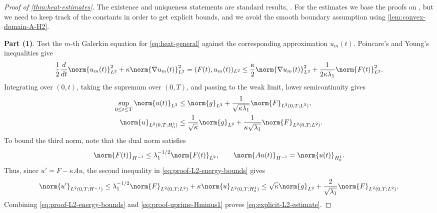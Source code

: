 \begin{proof}[Proof of \cref{thm:heat-estimates}]
The existence and uniqueness statements are standard results, \cite[Section 7.1.2]{evans_2010}. For the estimates we base the proofs on \cite{evans_2010}, but we need to keep track of the constants in order to get explicit bounds, and we avoid the smooth boundary assumption using \cref{lem:convex-domain-A-H2}.

\textbf{Part (1)}.
Test the $m$-th Galerkin equation for \eqref{eq:heat-general} against the corresponding approximation \(u_m(t)\).  Poincare's and Young's
inequalities give
\begin{equation}\label{eq:proof-L2-H1-differential}
    \frac12\frac{d}{dt}\norm{u_m(t)}_{L^2}^2
    +
    \kappa\norm{\nabla u_m(t)}_{L^2}^2
    =
    (F(t),u_m(t))_{L^2}
    \le
    \frac{\kappa}{2}\norm{\nabla u_m(t)}_{L^2}^2
    +
    \frac{1}{2\kappa\lambda_1}\norm{F(t)}_{L^2}^2.
\end{equation}
Integrating over \((0,t)\), taking the supremum over \((0,  T)\), and
passing to the weak limit, lower semicontinuity gives
\begin{equation}\label{eq:proof-L2-energy-bounds}
\begin{split}
    \sup_{0\le t\le T}\norm{u(t)}_{L^2}
    &\le
    \norm{g}_{L^2}
    +
    \frac1{\sqrt{\kappa\lambda_1}}
    \norm{F}_{L^2(0,T;L^2)},
    \\
    \norm{u}_{L^2(0,T;H_0^1)}
    &\le
    \frac1{\sqrt{\kappa}}\norm{g}_{L^2}
    +
    \frac1{\kappa\sqrt{\lambda_1}}
    \norm{F}_{L^2(0,T;L^2)}.
\end{split}
\end{equation}
To bound the third norm, note that
the dual norm satisfies
\begin{equation}\label{eq:proof-Hminus1-dual-bounds}
    \norm{F(t)}_{H^{-1}}
    \le
    \lambda_1^{-1/2}\norm{F(t)}_{L^2},
    \qquad
    \norm{Au(t)}_{H^{-1}}
    =
    \norm{u(t)}_{H_0^1}.
\end{equation}
Thus, since \(u'=F-\kappa Au\), the second inequality in \eqref{eq:proof-L2-energy-bounds} gives
\begin{equation}\label{eq:proof-uprime-Hminus1}
\begin{split}
    \norm{u'}_{L^2(0,T;H^{-1})}
    \le
    \lambda_1^{-1/2}
    \norm{F}_{L^2(0,T;L^2)}
    +
    \kappa
    \norm{u}_{L^2(0,T;H_0^1)}
    \le
    \sqrt{\kappa}\norm{g}_{L^2}
    +
    \frac2{\sqrt{\lambda_1}}
    \norm{F}_{L^2(0,T;L^2)}.
\end{split}
\end{equation}
Combining \eqref{eq:proof-L2-energy-bounds} and \eqref{eq:proof-uprime-Hminus1} proves
\eqref{eq:explicit-L2-estimate}.


\end{proof}
